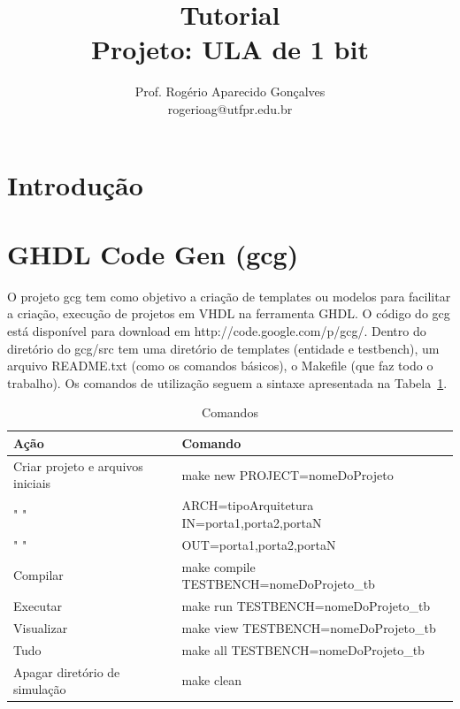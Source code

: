 \documentclass[a4paper,11pt]{report}
\title{Tutorial \\ Projeto: ULA de 1 bit}
\author{Prof. Rogério Aparecido Gonçalves \\ rogerioag@utfpr.edu.br}
\begin{document}
\maketitle
\pagestyle{plain} %
\cleardoublepage


\setcounter{chapter}{1}
\setcounter{section}{0}


\section{Introdução}

\section{GHDL Code Gen (gcg)}
O projeto gcg tem como objetivo a criação de templates ou modelos para facilitar a criação, execução de projetos em VHDL na ferramenta GHDL.
O código do gcg está disponível para download em http://code.google.com/p/gcg/.
Dentro do diretório do gcg/src tem uma diretório de templates (entidade e testbench), um arquivo README.txt (como os comandos básicos), o Makefile (que faz todo o trabalho).
Os comandos de utilização seguem a sintaxe apresentada na Tabela~\ref{tab:comandos_gcg}.

\begin{table}[H]
\centering
\caption{Comandos} %
\begin{tabular}{ll} %
\hline %
Ação & Comando \\ %
\hline
\hline
Criar projeto e arquivos iniciais & make new PROJECT=nomeDoProjeto \\
" " & ARCH=tipoArquitetura IN=porta1,porta2,portaN \\ 
" " & OUT=porta1,porta2,portaN \\
Compilar & make compile TESTBENCH=nomeDoProjeto\_tb \\
Executar & make run TESTBENCH=nomeDoProjeto\_tb \\
Visualizar & make view TESTBENCH=nomeDoProjeto\_tb \\
Tudo & make all TESTBENCH=nomeDoProjeto\_tb \\
Apagar diretório de simulação & make clean \\
\hline
\end{tabular}
\label{tab:comandos_gcg}
\end{table}
\end{document}
